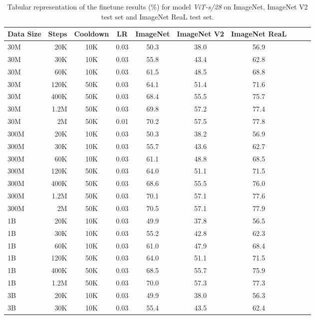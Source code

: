 \begin{table}[h]
  \setlength{\tabcolsep}{5pt}
  \setlength{\extrarowheight}{5pt}
  \renewcommand{\arraystretch}{0.75}
  \centering
  \caption{Tabular representation of the finetune results (\%) for model \emph{ViT-s/28} on ImageNet, ImageNet V2 test set and ImageNet ReaL test set.}\label{tbl:xs_28_ft}
  \begin{tabulary}{1.0\textwidth}{l r c c c c c c c c}
    \toprule[1pt]
    \bf{Data Size} & \bf{Steps} & \bf{Cooldown} & \bf{LR} & \bf{ImageNet} & \bf{ImageNet V2} & \bf{ImageNet ReaL} \\
    \midrule
30M   & 20K   & 10K   & 0.03 & 50.3 & 38.0 & 56.9 \\
30M   & 30K   & 10K   & 0.03 & 55.8 & 43.4 & 62.8 \\
30M   & 60K   & 10K   & 0.03 & 61.5 & 48.5 & 68.8 \\
30M   & 120K  & 50K   & 0.03 & 64.1 & 51.4 & 71.6 \\
30M   & 400K  & 50K   & 0.03 & 68.4 & 55.5 & 75.7 \\
30M   & 1.2M  & 50K   & 0.03 & 69.8 & 57.2 & 77.4 \\
30M   & 2M    & 50K   & 0.01 & 70.2 & 57.5 & 77.8 \\
\midrule[0.25pt]
300M  & 20K   & 10K   & 0.03 & 50.3 & 38.2 & 56.9 \\
300M  & 30K   & 10K   & 0.03 & 55.7 & 43.6 & 62.7 \\
300M  & 60K   & 10K   & 0.03 & 61.1 & 48.8 & 68.5 \\
300M  & 120K  & 50K   & 0.03 & 64.0 & 51.1 & 71.5 \\
300M  & 400K  & 50K   & 0.03 & 68.6 & 55.5 & 76.0 \\
300M  & 1.2M  & 50K   & 0.03 & 70.1 & 57.1 & 77.6 \\
300M  & 2M    & 50K   & 0.03 & 70.5 & 57.1 & 77.9 \\
\midrule[0.25pt]
1B    & 20K   & 10K   & 0.03 & 49.9 & 37.8 & 56.5 \\
1B    & 30K   & 10K   & 0.03 & 55.2 & 42.8 & 62.3 \\
1B    & 60K   & 10K   & 0.03 & 61.0 & 47.9 & 68.4 \\
1B    & 120K  & 50K   & 0.03 & 64.0 & 51.1 & 71.5 \\
1B    & 400K  & 50K   & 0.03 & 68.5 & 55.7 & 75.9 \\
1B    & 1.2M  & 50K   & 0.03 & 70.0 & 57.3 & 77.3 \\
\midrule[0.25pt]
3B    & 20K   & 10K   & 0.03 & 49.9 & 38.0 & 56.3 \\
3B    & 30K   & 10K   & 0.03 & 55.4 & 43.5 & 62.4 \\
    \bottomrule
  \end{tabulary}
\end{table}


